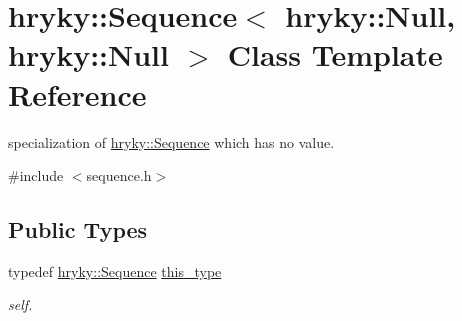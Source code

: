 \hypertarget{classhryky_1_1_sequence_3_01hryky_1_1_null_00_01hryky_1_1_null_01_4}{\section{hryky\-:\-:Sequence$<$ hryky\-:\-:Null, hryky\-:\-:Null $>$ Class Template Reference}
\label{classhryky_1_1_sequence_3_01hryky_1_1_null_00_01hryky_1_1_null_01_4}
}


specialization of \hyperlink{classhryky_1_1_sequence}{hryky\-::\-Sequence} which has no value.  




{\ttfamily \#include $<$sequence.\-h$>$}

\subsection*{Public Types}
\begin{DoxyCompactItemize}
\item 
\hypertarget{classhryky_1_1_sequence_3_01hryky_1_1_null_00_01hryky_1_1_null_01_4_a134e0cd5fc5770786dfbc9733481c2f8}{typedef \hyperlink{classhryky_1_1_sequence}{hryky\-::\-Sequence} \hyperlink{classhryky_1_1_sequence_3_01hryky_1_1_null_00_01hryky_1_1_null_01_4_a134e0cd5fc5770786dfbc9733481c2f8}{this\-\_\-type}}\label{classhryky_1_1_sequence_3_01hryky_1_1_null_00_01hryky_1_1_null_01_4_a134e0cd5fc5770786dfbc9733481c2f8}

\begin{DoxyCompactList}\small\item\em self. \end{DoxyCompactList}\end{DoxyCompactItemize}
